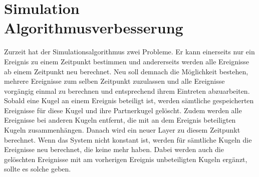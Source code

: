 \section{Simulation Algorithmusverbesserung}\label{anhang:simulation:algorithmus}

Zurzeit hat der Simulationsalgorithmus zwei Probleme. Er kann einerseits nur ein Ereignis zu einem Zeitpunkt bestimmen und
andererseits werden alle Ereignisse ab einem Zeitpunkt neu berechnet. Neu soll demnach die Möglichkeit bestehen, mehrere
Ereignisse zum selben Zeitpunkt zuzulassen und alle Ereignisse vorgängig einmal zu berechnen und entsprechend ihrem Eintreten
abzuarbeiten. Sobald eine Kugel an einem Ereignis beteiligt ist, werden sämtliche gespeicherten Ereignisse für diese Kugel und
ihre Partnerkugel gelöscht. Zudem werden alle Ereignisse bei anderen Kugeln entfernt, die mit an dem Ereignis beteiligten Kugeln
zusammenhängen. Danach wird ein neuer Layer zu diesem Zeitpunkt berechnet. Wenn das System nicht konstant ist, werden
für sämtliche Kugeln die Ereignisse neu berechnet, die keine mehr haben. Dabei werden auch die gelöschten Ereignisse
mit am vorherigen Ereignis unbeteiligten Kugeln ergänzt, sollte es solche geben.


